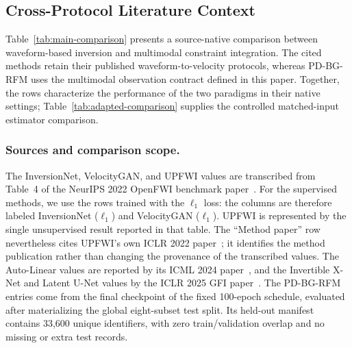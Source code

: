 \subsection{Cross-Protocol Literature Context}
\label{app:benchmark-accounting}

Table~\ref{tab:main-comparison} presents a source-native comparison between waveform-based inversion and multimodal constraint integration. The cited methods retain their published waveform-to-velocity protocols, whereas PD-BG-RFM uses the multimodal observation contract defined in this paper. Together, the rows characterize the performance of the two paradigms in their native settings; Table~\ref{tab:adapted-comparison} supplies the controlled matched-input estimator comparison.

\subsubsection{Sources and comparison scope.}
The InversionNet, VelocityGAN, and UPFWI values are transcribed from Table~4 of the NeurIPS 2022 OpenFWI benchmark paper~\cite{deng2022openfwi}. For the supervised methods, we use the rows trained with the $\ell_1$ loss: the columns are therefore labeled InversionNet ($\ell_1$) and VelocityGAN ($\ell_1$). UPFWI is represented by the single unsupervised result reported in that table. The ``Method paper'' row nevertheless cites UPFWI's own ICLR 2022 paper~\cite{jin2022upfwi}; it identifies the method publication rather than changing the provenance of the transcribed values. The Auto-Linear values are reported by its ICML 2024 paper~\cite{feng2024autolinear}, and the Invertible X-Net and Latent U-Net values by the ICLR 2025 GFI paper~\cite{gupta2025gfi}. The PD-BG-RFM entries come from the final checkpoint of the fixed 100-epoch schedule, evaluated after materializing the global eight-subset test split. Its held-out manifest contains 33,600 unique identifiers, with zero train/validation overlap and no missing or extra test records.

